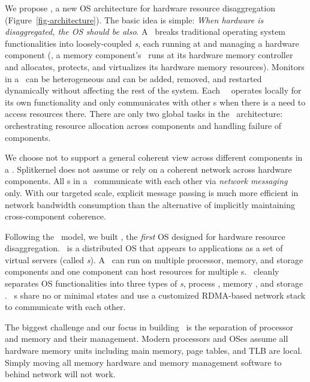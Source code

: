 \documentclass[10pt,times,twocolumn]{z2-article}
\begin{document}


We propose {\em \splitkernel}, a new OS architecture for hardware resource disaggregation (Figure~\ref{fig-architecture}).
The basic idea is simple: \textit{When hardware is disaggregated, the OS should be also}.  
A \splitkernel\ breaks traditional operating system functionalities into loosely-coupled {\em \microos{}s},
each running at and managing a hardware component
(\eg, a memory component's \microos\ runs at its hardware memory controller and allocates, protects, and virtualizes its hardware memory resources).
Monitors in a \splitkernel\ can be heterogeneous and can be added, removed, 
and restarted dynamically without affecting the rest of the system.
Each \splitkernel\ \microos\ operates locally for its own functionality and
only communicates with other \microos{}s when there is a need to access resources there.
There are only two global tasks in the \splitkernel\ architecture: 
orchestrating resource allocation across components 
and handling failure of components.


We choose not to support a general coherent view across different components in a \splitkernel.
Splitkernel does not assume or rely on a coherent network across hardware components.
All \microos{}s in a \splitkernel\ communicate with each other via {\em network messaging} only.
With our targeted scale, explicit message passing is much more efficient in network bandwidth consumption 
than the alternative of implicitly maintaining cross-component coherence.

Following the \splitkernel\ model, 
we built \lego, the {\em first} OS designed for hardware resource disaggregation.
\lego\ is a distributed OS that appears to applications as a set of virtual servers (called {\em \vnode{}s}).
A \vnode\ can run on multiple processor, memory, and storage components
and one component can host resources for multiple \vnode{}s.
\lego\ cleanly separates OS functionalities into %
three types of {\em \microos{}s},
process \microos, memory \microos, and storage \microos. %
\lego\ \microos{}s share no or minimal states
and use a customized RDMA-based network stack to communicate with each other.

The biggest challenge and our focus in building \lego\ is the separation of processor and memory and their management.
Modern processors and OSes assume all hardware memory units including main memory, page tables, and TLB are local.
Simply moving all memory hardware and memory management software to behind network will not work.
\end{document}
